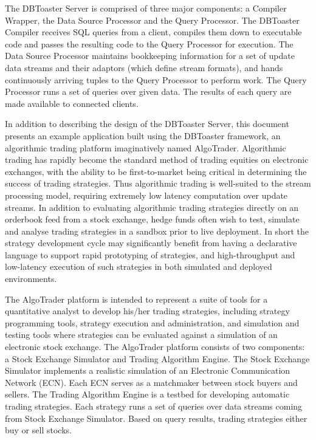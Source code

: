 \documentclass[14pt]{article}
\begin{document}
The DBToaster Server is comprised of three major components: a Compiler Wrapper,
the Data Source Processor and the Query Processor. The DBToaster Compiler
receives SQL queries from a client, compiles them down to executable code and
passes the resulting code to the Query Processor for execution. The Data Source
Processor maintains bookkeeping information for a set of update data streams and
their adaptors (which define stream formats), and hands continuously arriving
tuples to the Query Processor to perform work. The Query Processor runs a set of
queries over given data. The results of each query are made available to
connected clients.

In addition to describing the design of the DBToaster Server, this document presents
an example application built using the DBToaster framework, an algorithmic trading
platform imaginatively named AlgoTrader. 
Algorithmic trading has rapidly become the standard method of trading
equities on electronic exchanges, with the ability to be first-to-market being
critical in determining the success of trading strategies. Thus algorithmic
trading is well-suited to the stream processing model, requiring extremely low
latency computation over update streams. In addition to evaluating algorithmic
trading strategies directly on an orderbook feed from a stock exchange, hedge
funds often wish to test, simulate and analyse trading strategies in a sandbox
prior to live deployment. In short the strategy development cycle may
significantly benefit from having a declarative language to support rapid
prototyping of strategies, and high-throughput and low-latency execution of such
strategies in both simulated and deployed environments.

The AlgoTrader platform is intended to represent a suite of tools for a
quantitative analyst to develop his/her trading strategies, including strategy
programming tools, strategy execution and administration, and simulation and
testing tools where strategies can be evaluated against a simulation of an
electronic stock exchange.
The AlgoTrader platform consists of two components: a Stock Exchange Simulator
and Trading Algorithm Engine. The Stock Exchange Simulator implements a
realistic simulation of an Electronic Communication Network (ECN). Each ECN
serves as a matchmaker between stock buyers and sellers. The Trading Algorithm
Engine is a testbed for developing automatic trading strategies. Each strategy
runs a set of queries over data streams coming from Stock Exchange
Simulator. Based on query results, trading strategies either buy or sell stocks.
\end{document}
